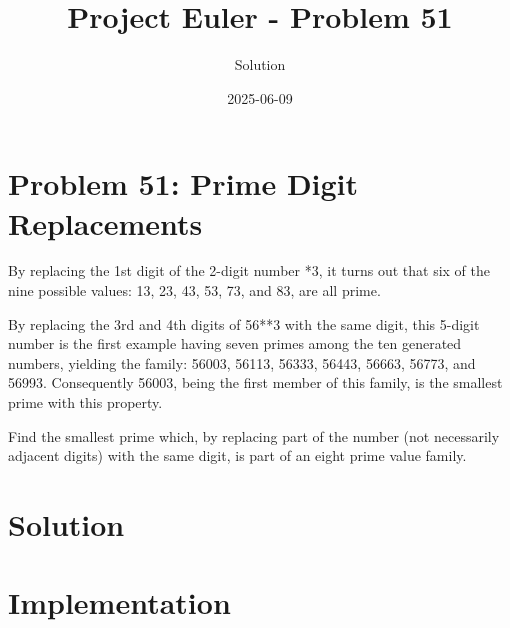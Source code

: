 \documentclass{article}
\title{Project Euler - Problem 51}
\author{Solution}
\date{2025-06-09}
\begin{document}
\maketitle

\section*{Problem 51: Prime Digit Replacements}


By replacing the 1st digit of the 2-digit number *3, it turns out that six of the nine possible values: 13, 23, 43, 53, 73, and 83, are all prime.

\par
By replacing the 3rd and 4th digits of 56**3 with the same digit, this 5-digit number is the first example having seven primes among the ten generated numbers, yielding the family: 56003, 56113, 56333, 56443, 56663, 56773, and 56993. Consequently 56003, being the first member of this family, is the smallest prime with this property.

\par
Find the smallest prime which, by replacing part of the number (not necessarily adjacent digits) with the same digit, is part of an eight prime value family.

\par


\section*{Solution}


\section*{Implementation}

\end{document}
